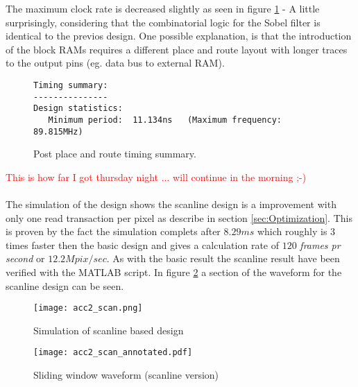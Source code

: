 The maximum clock rate is decreased slightly as seen in figure \ref{fig:sum_ScanPostPAR_report} - A little surprisingly, considering that the combinatorial logic for the Sobel filter is identical to the previos design. One possible explanation, is that the introduction of the block RAMs requires a different place and route layout with longer traces to the output pins (eg. data bus to external RAM).

\begin{figure}[H]
\centering
\small
\begin{BVerbatim}
Timing summary:
---------------
Design statistics:
   Minimum period:  11.134ns   (Maximum frequency:  89.815MHz)
\end{BVerbatim}
\caption{Post place and route timing summary.}
\label{fig:sum_ScanPostPAR_report}
\end{figure}

\textcolor{red}{ This is how far I got thursday night ... will continue in the morning ;-)}

\paragraph*{}
The simulation of the design shows the scanline design is a improvement with only one read transaction per pixel as describe in section \ref{sec:Optimization}. This is proven by the fact the simulation complets after $8.29ms$ which roughly is 3 times faster then the basic design and gives a calculation rate of $120$ \textit{frames pr second} or $12.2Mpix/sec$. As with the basic result the scanline result have been verified with the MATLAB script. In figure \ref{fig:acc2_scanWave} a section of the waveform  for the scanline design can be seen.

\begin{figure}[H]
	\centering
    \texttt{[image: acc2\_scan.png]}
	\caption{Simulation of scanline based design}
	\label{fig:acc2_scanWave}
\end{figure}

\begin{figure}[H]
	\centering
    \texttt{[image: acc2\_scan\_annotated.pdf]}
	\caption{Sliding window waveform (scanline version)}
	\label{fig:acc2_scanWaveSlide}
\end{figure}

